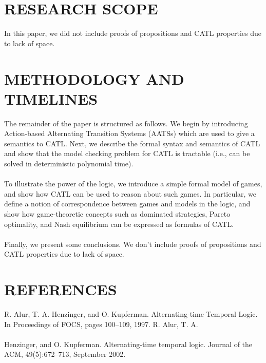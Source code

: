 \documentclass[10pt,a4paper]{article}
\begin{document}
\section{RESEARCH SCOPE}
In this paper, we did not include proofs of propositions and CATL properties due to lack of space.


\section{METHODOLOGY AND TIMELINES}
The remainder of the paper is structured as follows. 
We begin by introducing Action-based Alternating Transition Systems (AATSs)  which are used to give a semantics to CATL. Next, we describe the formal syntax and semantics of CATL and show that the model checking problem for CATL is tractable (i.e., can be solved in deterministic polynomial time). \\\\To illustrate the power of the logic, we introduce a simple formal model of games, and show how CATL can be used to reason about such games. In particular, we define a notion of correspondence between games and models in the logic, and show how game-theoretic concepts such as dominated strategies, Pareto optimality, and Nash equilibrium can be expressed as formulas of CATL.\\\\ Finally, we present some conclusions. We don’t include proofs of propositions and CATL properties due to lack of space.

\section{REFERENCES}


R. Alur, T. A. Henzinger, and O. Kupferman. Alternating-time Temporal Logic. In Proceedings of FOCS, pages 100–109, 1997.  R. Alur, T. A.\\\\Henzinger, and O. Kupferman.
Alternating-time temporal logic. Journal of the ACM, 49(5):672–713, September 2002.
 
	
\end{document}
